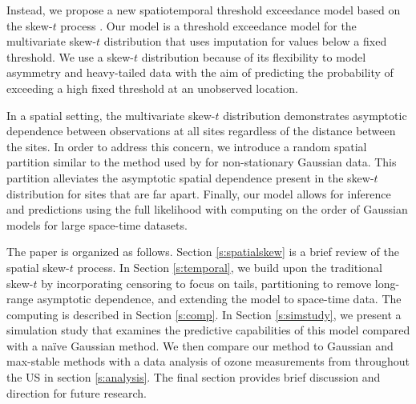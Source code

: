 \documentclass[11pt]{article}
\begin{document}
Instead, we propose a new spatiotemporal threshold exceedance model based on the skew-$t$ process \citep{Padoan2011}.
Our model is a threshold exceedance model for the multivariate skew-$t$ distribution that uses imputation for values below a fixed threshold.
We use a skew-$t$ distribution because of its flexibility to model asymmetry and heavy-tailed data with the aim of predicting the probability of exceeding a high fixed threshold at an unobserved location.

In a spatial setting, the multivariate skew-$t$ distribution demonstrates asymptotic dependence between observations at all sites regardless of the distance between the sites.
In order to address this concern, we introduce a random spatial partition similar to the method used by \citet{Kim2005} for non-stationary Gaussian data.
This partition alleviates the asymptotic spatial dependence present in the skew-$t$ distribution for sites that are far apart.
Finally, our model allows for inference and predictions using the full likelihood with computing on the order of Gaussian models for large space-time datasets.

The paper is organized as follows.
Section \ref{s:spatialskew} is a brief review of the spatial skew-$t$ process.
In Section \ref{s:temporal}, we build upon the traditional skew-$t$ by incorporating censoring to focus on tails, partitioning to remove long-range asymptotic dependence, and extending the model to space-time data.
The computing is described in Section \ref{s:comp}.
In Section \ref{s:simstudy}, we present a simulation study that examines the predictive capabilities of this model compared with a na{\"i}ve Gaussian method.
We then compare our method to Gaussian and max-stable methods with a data analysis of ozone measurements from throughout the US in section \ref{s:analysis}.
The final section provides brief discussion and direction for future research.


\end{document}
